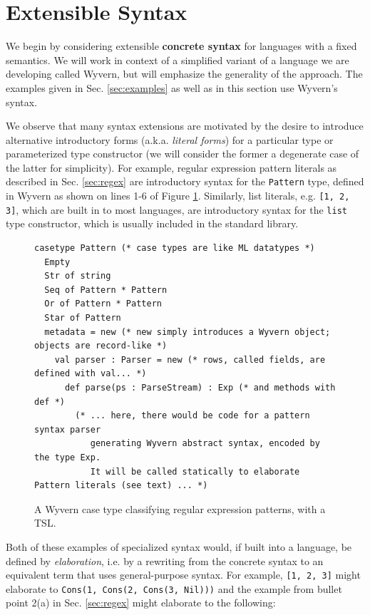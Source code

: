 \section{Extensible Syntax}\label{sec:syntax}

We begin by considering extensible \textbf{concrete syntax} for languages with a fixed semantics. We will work in context of a simplified variant of a language we are developing called Wyvern, but will emphasize the generality of the approach. The examples given in Sec. \ref{sec:examples} as well as in this section use Wyvern's syntax.

We observe that many syntax extensions are motivated by the desire to introduce alternative  introductory forms (a.k.a. \emph{literal forms}) for a particular type or parameterized type constructor (we will consider the former a degenerate case of the latter for simplicity). For example, regular expression pattern literals as described in Sec. \ref{sec:regex} are introductory syntax for the \verb|Pattern| type, defined  in Wyvern as shown on lines 1-6 of Figure \ref{fig:pattern}. Similarly, list literals, e.g. \verb|[1, 2, 3]|, which are built in to most languages,  are introductory syntax for the \verb|list| type constructor, which is usually included in the standard library.

\begin{figure}
\begin{lstlisting}[escapechar=$]
casetype Pattern (* case types are like ML datatypes *)
  Empty
  Str of string
  Seq of Pattern * Pattern
  Or of Pattern * Pattern
  Star of Pattern
  metadata = new (* new simply introduces a Wyvern object; objects are record-like *)
    val parser : Parser = new (* rows, called fields, are defined with val... *)
      def parse(ps : ParseStream) : Exp (* and methods with def *)
        (* ... here, there would be code for a pattern syntax parser
           generating Wyvern abstract syntax, encoded by the type Exp. 
           It will be called statically to elaborate Pattern literals (see text) ... *)
\end{lstlisting}
\vspace{-8px}
\caption{A Wyvern case type classifying regular expression patterns, with a TSL.}
\label{fig:pattern}
\end{figure}

Both of these examples of specialized syntax would, if built into a language, be defined by \emph{elaboration}, i.e. by a rewriting from the concrete syntax to an equivalent term that uses general-purpose syntax. For example, \verb|[1, 2, 3]| might elaborate to \verb|Cons(1, Cons(2, Cons(3, Nil)))| and the example from bullet point 2(a) in Sec. \ref{sec:regex} might elaborate to the following:

